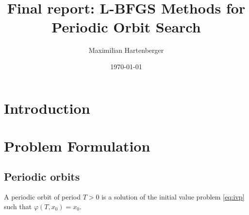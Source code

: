 \documentclass[11pt,a4paper]{article}
\title{Final report: L-BFGS Methods for Periodic Orbit Search}
\author{Maximilian Hartenberger}
\date{\today}
\begin{document}
\maketitle

\begin{abstract}
\end{abstract}

\section{Introduction}

\section{Problem Formulation}
\subsection{Periodic orbits}
A periodic orbit of period $T>0$ is a solution of the initial value problem \eqref{eq:ivp} such that $\varphi(T,x_0) = x_0$.
\end{document}
